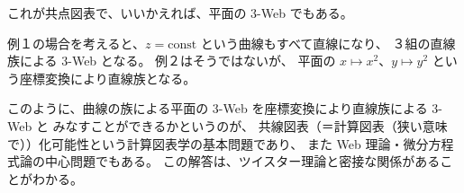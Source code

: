 \documentclass[uplatex,dvipdfmx]{jlreq}
\begin{document}
これが共点図表で、いいかえれば、平面の $3$-Web でもある。

\bigskip

例１の場合を考えると、$z = \mathrm{const}$ という曲線もすべて直線になり、
３組の直線族による $3$-Web となる。
例２はそうではないが、
平面の $x \mapsto x^2$、$y \mapsto y^2$ という座標変換により直線族となる。

\medskip

このように、曲線の族による平面の $3$-Web を座標変換により直線族による $3$-Web と
みなすことができるかというのが、
共線図表（＝計算図表（狭い意味で））化可能性という計算図表学の基本問題であり、
また Web 理論・微分方程式論の中心問題でもある。
この解答は、ツイスター理論と密接な関係があることがわかる。
\end{document}
